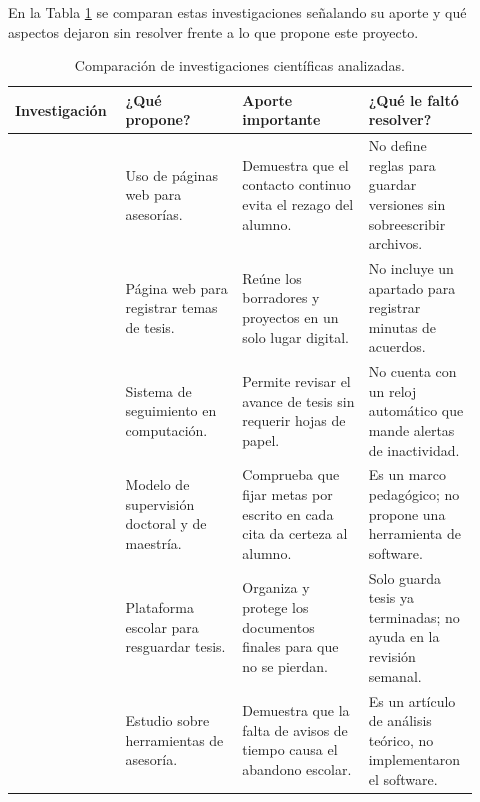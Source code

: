 En la Tabla \ref{tab:literatura_cientifica} se comparan estas investigaciones señalando su aporte y qué aspectos dejaron sin resolver frente a lo que propone este proyecto.

\begin{table}[htbp]
\centering
\small
\singlespacing
\caption{Comparación de investigaciones científicas analizadas.}
\label{tab:literatura_cientifica}
\begin{tabular}{p{0.22\linewidth} p{0.24\linewidth} p{0.26\linewidth} p{0.20\linewidth}}
\toprule
\textbf{Investigación} & \textbf{¿Qué propone?} & \textbf{Aporte importante} & \textbf{¿Qué le faltó resolver?} \\
\midrule
\textcite{sim2023technology} & 
Uso de páginas web para asesorías. & 
Demuestra que el contacto continuo evita el rezago del alumno. & 
No define reglas para guardar versiones sin sobreescribir archivos. \\
\addlinespace
\textcite{ali2024thesis} & 
Página web para registrar temas de tesis. & 
Reúne los borradores y proyectos en un solo lugar digital. & 
No incluye un apartado para registrar minutas de acuerdos. \\
\addlinespace
\textcite{sayeh2021web} & 
Sistema de seguimiento en computación. & 
Permite revisar el avance de tesis sin requerir hojas de papel. & 
No cuenta con un reloj automático que mande alertas de inactividad. \\
\addlinespace
\textcite{lee2012successful} & 
Modelo de supervisión doctoral y de maestría. & 
Comprueba que fijar metas por escrito en cada cita da certeza al alumno. & 
Es un marco pedagógico; no propone una herramienta de software. \\
\addlinespace
\textcite{mebtouche2025national} & 
Plataforma escolar para resguardar tesis. & 
Organiza y protege los documentos finales para que no se pierdan. & 
Solo guarda tesis ya terminadas; no ayuda en la revisión semanal. \\
\addlinespace
\textcite{lando2025digital} & 
Estudio sobre herramientas de asesoría. & 
Demuestra que la falta de avisos de tiempo causa el abandono escolar. & 
Es un artículo de análisis teórico, no implementaron el software. \\
\bottomrule
\end{tabular}
\end{table}
